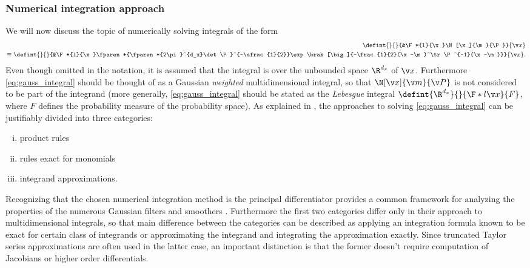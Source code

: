 \subsubsection{Numerical integration approach}
 We will now discuss the topic of numerically solving integrals of the form
 \begin{align}
	\defint{}{}{&\F*{l}{\x}\N[\x]{\m}{\P}}{\x} \nonumber\\
	\equiv\defint{}{}{&\F*{l}{\x}\fparen*{\fparen*{2\pi}^{d_x}\det\P}^{-\sfrac{1}{2}}\exp\brak[\big]{-\frac{1}{2}(\x-\m)^\tr\P^{-1}(\x-\m)}}{\x}.
	\label{eq:gauss_integral}
\end{align}%
%
Even though omitted in the notation, it is assumed that the integral
is over the unbounded space $\R^{d_x}$ of $\x$. Furthermore \eqref{eq:gauss_integral}
should be thought of as a Gaussian \emph{weighted} multidimensional integral, so that $\N[\x]{\m}{\P}$
is not considered to be part of the integrand (more generally, \eqref{eq:gauss_integral}
should be stated as the \emph{Lebesgue} integral $\defint{\R^{d_x}}{}{\F*{l}{\x}}{F}$, where $F$
defines the probability measure of the probability space).
As explained in \textcite{Wu2006}, the approaches to solving \eqref{eq:gauss_integral}
can be justifiably divided into three categories: 
\begin{enumerate}[i)] \addtolength{\leftskip}{.5cm} \itemsep1pt \parskip0pt 
  \item product rules
  \item rules exact for monomials
  \item integrand approximations.
\end{enumerate}
Recognizing that the chosen numerical integration method is the principal differentiator provides a 
common framework for analyzing the properties of the numerous Gaussian filters and smoothers \parencite{Sarkka2010, Sarkka2008a}.
Furthermore the first two categories differ only in their approach to multidimensional integrals,
so that main difference between the categories can be described
as applying an integration formula known to be exact for certain class of integrands
or approximating the integrand and integrating the approximation exactly.
Since truncated Taylor series approximations are often used in the latter case, an important distinction
is that the former doesn't require computation of Jacobians or higher order differentials. 

